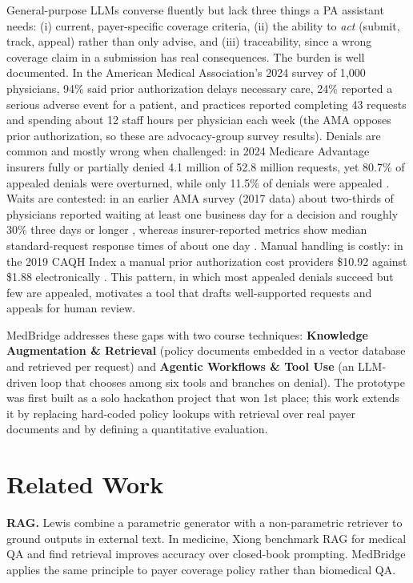 \documentclass[final]{cvpr}
\begin{document}
\smallskip
General-purpose LLMs converse fluently but lack three things a PA assistant needs: (i) current, payer-specific coverage criteria, (ii) the ability to \emph{act} (submit, track, appeal) rather than only advise, and (iii) traceability, since a wrong coverage claim in a submission has real consequences. The burden is well documented. In the American Medical Association's 2024 survey of 1{,}000 physicians, 94\% said prior authorization delays necessary care, 24\% reported a serious adverse event for a patient, and practices reported completing 43 requests and spending about 12 staff hours per physician each week \cite{ama2024} (the AMA opposes prior authorization, so these are advocacy-group survey results). Denials are common and mostly wrong when challenged: in 2024 Medicare Advantage insurers fully or partially denied 4.1 million of 52.8 million requests, yet 80.7\% of appealed denials were overturned, while only 11.5\% of denials were appealed \cite{kff2024}. Waits are contested: in an earlier AMA survey (2017 data) about two-thirds of physicians reported waiting at least one business day for a decision and roughly 30\% three days or longer \cite{ama2018}, whereas insurer-reported metrics show median standard-request response times of about one day \cite{kffmetrics}. Manual handling is costly: in the 2019 CAQH Index a manual prior authorization cost providers \$10.92 against \$1.88 electronically \cite{caqh2019}. This pattern, in which most appealed denials succeed but few are appealed, motivates a tool that drafts well-supported requests and appeals for human review.

MedBridge addresses these gaps with two course techniques: \textbf{Knowledge Augmentation \& Retrieval} (policy documents embedded in a vector database and retrieved per request) and \textbf{Agentic Workflows \& Tool Use} (an LLM-driven loop that chooses among six tools and branches on denial). The prototype was first built as a solo hackathon project that won 1st place; this work extends it by replacing hard-coded policy lookups with retrieval over real payer documents and by defining a quantitative evaluation.

\section{Related Work}
\textbf{RAG.} Lewis \etal\cite{lewis2020rag} combine a parametric generator with a non-parametric retriever to ground outputs in external text. In medicine, Xiong \etal\cite{xiong2024medrag} benchmark RAG for medical QA and find retrieval improves accuracy over closed-book prompting. MedBridge applies the same principle to payer coverage policy rather than biomedical QA.
\end{document}
